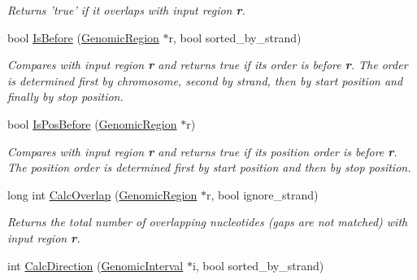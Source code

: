 \begin{DoxyCompactItemize}
\begin{DoxyCompactList}\small\item\em Returns 'true' if it overlaps with input region {\bfseries r}. \end{DoxyCompactList}\item 
\hypertarget{classGenomicRegion_a25634257eb7a2ed379548b17a83414fb}{
bool \hyperlink{classGenomicRegion_a25634257eb7a2ed379548b17a83414fb}{IsBefore} (\hyperlink{classGenomicRegion}{GenomicRegion} $\ast$r, bool sorted\_\-by\_\-strand)}
\label{classGenomicRegion_a25634257eb7a2ed379548b17a83414fb}

\begin{DoxyCompactList}\small\item\em Compares with input region {\bfseries r} and returns true if its order is before {\bfseries r}. The order is determined first by chromosome, second by strand, then by start position and finally by stop position. \end{DoxyCompactList}\item 
\hypertarget{classGenomicRegion_a2065cf74a82c2340b1e49e7f7ec0fdd4}{
bool \hyperlink{classGenomicRegion_a2065cf74a82c2340b1e49e7f7ec0fdd4}{IsPosBefore} (\hyperlink{classGenomicRegion}{GenomicRegion} $\ast$r)}
\label{classGenomicRegion_a2065cf74a82c2340b1e49e7f7ec0fdd4}

\begin{DoxyCompactList}\small\item\em Compares with input region {\bfseries r} and returns true if its position order is before {\bfseries r}. The position order is determined first by start position and then by stop position. \end{DoxyCompactList}\item 
\hypertarget{classGenomicRegion_a623e28aab180174d43873c4a85342ad4}{
long int \hyperlink{classGenomicRegion_a623e28aab180174d43873c4a85342ad4}{CalcOverlap} (\hyperlink{classGenomicRegion}{GenomicRegion} $\ast$r, bool ignore\_\-strand)}
\label{classGenomicRegion_a623e28aab180174d43873c4a85342ad4}

\begin{DoxyCompactList}\small\item\em Returns the total number of overlapping nucleotides (gaps are not matched) with input region {\bfseries r}. \end{DoxyCompactList}\item 
\hypertarget{classGenomicRegion_ada548684fc4ae44dd3782aa15eaaf0a8}{
int \hyperlink{classGenomicRegion_ada548684fc4ae44dd3782aa15eaaf0a8}{CalcDirection} (\hyperlink{classGenomicInterval}{GenomicInterval} $\ast$i, bool sorted\_\-by\_\-strand)}
\label{classGenomicRegion_ada548684fc4ae44dd3782aa15eaaf0a8}


\end{DoxyCompactItemize}
